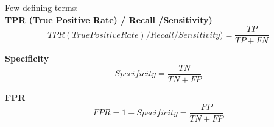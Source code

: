 Few defining terms:-\\
\textbf{TPR (True Positive Rate) / Recall /Sensitivity)} \\

\begin{equation*}
    TPR (True Positive Rate) / Recall /Sensitivity) = \frac{TP}{TP+FN}
\end{equation*}

\textbf{Specificity}\\
\begin{equation*}
    Specificity = \frac{TN}{TN+FP}

\end{equation*}

\textbf{FPR} \\
\begin{equation*}
    FPR = 1- Specificity
        = \frac{FP}{TN+FP}
\end{equation*}














\setcounter{equation}{0}
\setcounter{table}{0}
\setcounter{figure}{0}
